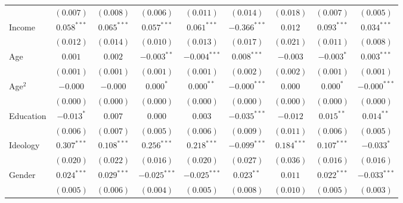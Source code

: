 \documentclass[12pt, letter]{article}
\begin{document}
\begin{table}[H]
\begin{center}
{\begin{tabular}{l c c c c c c c c }
                                 & $(0.007)$      & $(0.008)$      & $(0.006)$      & $(0.011)$      & $(0.014)$      & $(0.018)$      & $(0.007)$      & $(0.005)$      \\
Income                           & $0.058^{***}$  & $0.065^{***}$  & $0.057^{***}$  & $0.061^{***}$  & $-0.366^{***}$ & $0.012$        & $0.093^{***}$  & $0.034^{***}$  \\
                                 & $(0.012)$      & $(0.014)$      & $(0.010)$      & $(0.013)$      & $(0.017)$      & $(0.021)$      & $(0.011)$      & $(0.008)$      \\
Age                              & $0.001$        & $0.002$        & $-0.003^{**}$  & $-0.004^{***}$ & $0.008^{***}$  & $-0.003$       & $-0.003^{*}$   & $0.003^{***}$  \\
                                 & $(0.001)$      & $(0.001)$      & $(0.001)$      & $(0.001)$      & $(0.002)$      & $(0.002)$      & $(0.001)$      & $(0.001)$      \\
Age$^2$                            & $-0.000$       & $-0.000$       & $0.000^{*}$    & $0.000^{**}$   & $-0.000^{***}$ & $0.000$        & $0.000^{*}$    & $-0.000^{***}$ \\
                                 & $(0.000)$      & $(0.000)$      & $(0.000)$      & $(0.000)$      & $(0.000)$      & $(0.000)$      & $(0.000)$      & $(0.000)$      \\
Education                        & $-0.013^{*}$   & $0.007$        & $0.000$        & $0.003$        & $-0.035^{***}$ & $-0.012$       & $0.015^{**}$   & $0.014^{**}$   \\
                                 & $(0.006)$      & $(0.007)$      & $(0.005)$      & $(0.006)$      & $(0.009)$      & $(0.011)$      & $(0.006)$      & $(0.005)$      \\
Ideology                         & $0.307^{***}$  & $0.108^{***}$  & $0.256^{***}$  & $0.218^{***}$  & $-0.099^{***}$ & $0.184^{***}$  & $0.107^{***}$  & $-0.033^{*}$   \\
                                 & $(0.020)$      & $(0.022)$      & $(0.016)$      & $(0.020)$      & $(0.027)$      & $(0.036)$      & $(0.016)$      & $(0.016)$      \\
Gender                           & $0.024^{***}$  & $0.029^{***}$  & $-0.025^{***}$ & $-0.025^{***}$ & $0.023^{**}$   & $0.011$        & $0.022^{***}$  & $-0.033^{***}$ \\
                                 & $(0.005)$      & $(0.006)$      & $(0.004)$      & $(0.005)$      & $(0.008)$      & $(0.010)$      & $(0.005)$      & $(0.003)$      \\

\end{tabular}}
\end{center}
\end{table}
\end{document}
